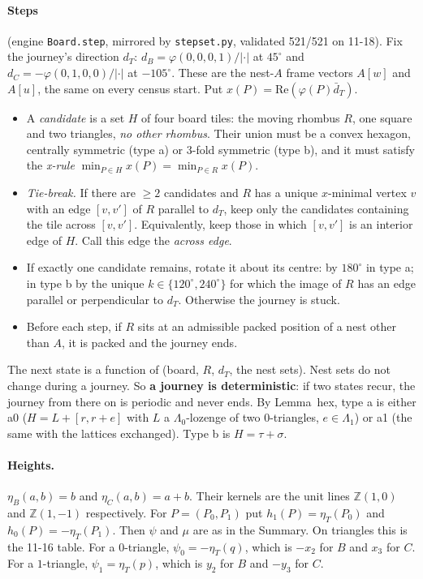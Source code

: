 \documentclass[11pt]{article}
\theoremstyle{definition}\newtheorem{definition}[theorem]{Definition}\newtheorem{remark}[theorem]{Remark}
\newcommand{\Z}{\mathbb Z}
\begin{document}
\paragraph{Steps} (engine \texttt{Board.step}, mirrored by \texttt{stepset.py}, validated 521/521 on 11-18). Fix the journey's direction $d_T$: $d_B=\varphi(0,0,0,1)/|\cdot|$ at $45^\circ$ and $d_C=-\varphi(0,1,0,0)/|\cdot|$ at $-105^\circ$. These are the nest-$A$ frame vectors $A[w]$ and $A[u]$, the same on every census start. Put $x(P)=\mathrm{Re}(\varphi(P)\bar d_T)$.
\begin{itemize}
\item[(S1)] A \emph{candidate} is a set $H$ of four board tiles: the moving rhombus $R$, one square and two triangles, \emph{no other rhombus}. Their union must be a convex hexagon, centrally symmetric (type a) or $3$-fold symmetric (type b), and it must satisfy the \emph{x-rule} $\min_{P\in H}x(P)=\min_{P\in R}x(P)$.
\item[(S2)] \emph{Tie-break.} If there are $\ge2$ candidates and $R$ has a unique $x$-minimal vertex $v$ with an edge $[v,v']$ of $R$ parallel to $d_T$, keep only the candidates containing the tile across $[v,v']$. Equivalently, keep those in which $[v,v']$ is an interior edge of $H$. Call this edge the \emph{across edge}.
\item[(S3)] If exactly one candidate remains, rotate it about its centre: by $180^\circ$ in type a; in type b by the unique $k\in\{120^\circ,240^\circ\}$ for which the image of $R$ has an edge parallel or perpendicular to $d_T$. Otherwise the journey is stuck.
\item[(S4)] Before each step, if $R$ sits at an admissible packed position of a nest other than $A$, it is packed and the journey ends.
\end{itemize}
The next state is a function of (board, $R$, $d_T$, the nest sets). Nest sets do not change during a journey. So \textbf{a journey is deterministic}: if two states recur, the journey from there on is periodic and never ends.
By Lemma~hex, type a is either a0 ($H=L+[r,r+e]$ with $L$ a $\Lambda_0$-lozenge of two $0$-triangles, $e\in\Lambda_1$) or a1 (the same with the lattices exchanged). Type b is $H=\tau+\sigma$.

\paragraph{Heights.} $\eta_B(a,b)=b$ and $\eta_C(a,b)=a+b$. Their kernels are the unit lines $\Z(1,0)$ and $\Z(1,-1)$ respectively. For $P=(P_0,P_1)$ put $h_1(P)=\eta_T(P_0)$ and $h_0(P)=-\eta_T(P_1)$. Then $\psi$ and $\mu$ are as in the Summary.
On triangles this is the 11-16 table. For a $0$-triangle, $\psi_0=-\eta_T(q)$, which is $-x_2$ for $B$ and $x_3$ for $C$. For a $1$-triangle, $\psi_1=\eta_T(p)$, which is $y_2$ for $B$ and $-y_3$ for $C$.
\end{document}
